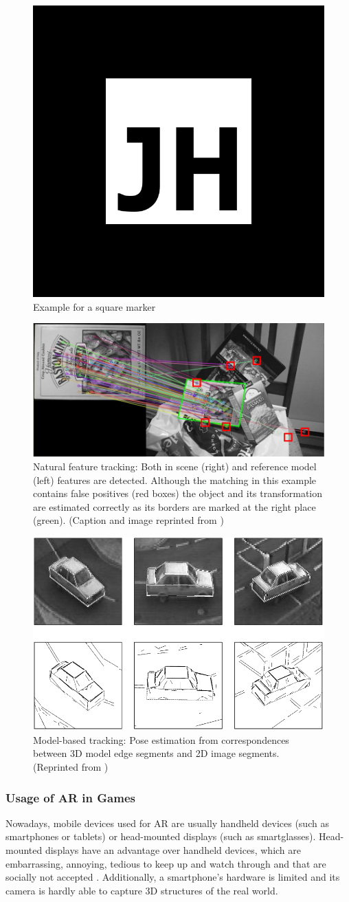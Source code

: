 \begin{figure}[bth]
  \centering
        \includegraphics[width=.2\linewidth]{gfx/jh_marker}
        \caption{Example for a square marker}
        \label{fig:marker}
\end{figure}
\begin{figure}[bth]
  \centering
        \includegraphics[width=.65\linewidth]{gfx/nft_tracking_reprint}
        \caption{Natural feature tracking: Both in scene (right) and reference model (left) features are detected. Although the matching in this
example contains false positives (red boxes) the object and its transformation are estimated correctly
as its borders are marked at the right place (green). (Caption and image reprinted from \citep{hock2014augmented})}
        \label{fig:nft-tracking}
\end{figure}
\begin{figure}[bth]
  \centering
        \includegraphics[width=.45\linewidth]{gfx/model_based_tracking_reprint}
        \caption{Model-based tracking: Pose estimation from correspondences between 3D model edge segments and 2D image segments. (Reprinted from \citep{lepetit2005monocular})}
        \label{fig:model-based-tracking}
\end{figure}

\subsubsection{Usage of AR in Games}\label{sec:usageOfARStateOfTheArt}
Nowadays, mobile devices used for AR are usually handheld devices (such as smartphones or tablets) or head-mounted displays (such as smartglasses). Head-mounted displays have an advantage over handheld devices, which are embarrassing, annoying, tedious to keep up and watch through and that are socially not accepted \citep{smartphoneAR}. Additionally, a smartphone's hardware is limited and its camera is hardly able to capture 3D structures of the real world.

